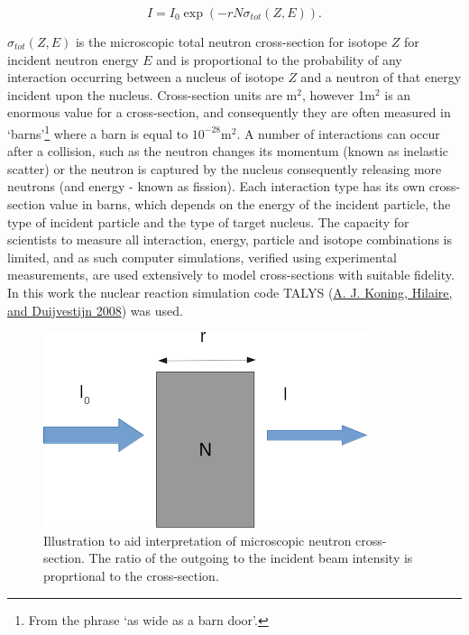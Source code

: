 \documentclass[
  12pt,
  a4paper,
  twoside]{book}
\begin{document}
\begin{equation}
\label{eq:total_xs}
I = I_0 \exp\left(-rN \sigma_{tot}(Z,E)\right).
\end{equation}

\(\sigma_{tot}(Z,E)\) is the microscopic total neutron cross-section for isotope \(Z\) for incident neutron energy \(E\) and is proportional to the probability of any interaction occurring between a nucleus of isotope \(Z\) and a neutron of that energy incident upon the nucleus. Cross-section units are m\(^2\), however 1m\(^2\) is an enormous value for a cross-section, and consequently they are often measured in `barns'\footnote{From the phrase `as wide as a barn door'.} where a barn is equal to \(10^{-28}\)m\(^2\). A number of interactions can occur after a collision, such as the neutron changes its momentum (known as inelastic scatter) or the neutron is captured by the nucleus consequently releasing more neutrons (and energy - known as fission). Each interaction type has its own cross-section value in barns, which depends on the energy of the incident particle, the type of incident particle and the type of target nucleus. The capacity for scientists to measure all
interaction, energy, particle and isotope combinations is limited, and as such computer simulations, verified using experimental measurements, are used extensively to model cross-sections with suitable fidelity. In this work the nuclear reaction simulation code TALYS (\protect\hyperlink{ref-talys}{A. J. Koning, Hilaire, and Duijvestijn 2008}) was used.

\begin{figure}[H]
 
 {\centering \includegraphics[width=0.8\linewidth]{figures/xs_cropped} 
 
 }
 
 \caption{Illustration to aid interpretation of microscopic neutron cross-section. The ratio of the outgoing to the incident beam intensity is proprtional to the cross-section.}\label{fig:xs-schematic}
 \end{figure}
\end{document}
